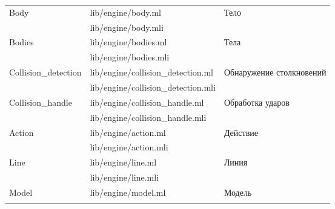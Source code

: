 \begin{centering}
\begin{longtable}{|l|l|l|}
        \multirow{2}{*}{Body}                                 & lib/engine/body.ml                  & \multirow{2}{*}{Тело}                       \\\nopagebreak \cline{2-2}
                                                              & lib/engine/body.mli                 &                                             \\ \hline
        \multirow{2}{*}{Bodies}                               & lib/engine/bodies.ml                & \multirow{2}{*}{Тела}                       \\\nopagebreak \cline{2-2}
                                                              & lib/engine/bodies.mli               &                                             \\ \hline
        \multirow{2}{*}{Collision\_detection}                 & lib/engine/collision\_detection.ml  & \multirow{2}{2cm}{Обнаружение столкновений} \\\nopagebreak \cline{2-2}
                                                              & lib/engine/collision\_detection.mli &                                             \\ \hline
        \multirow{2}{*}{Collision\_handle}                    & lib/engine/collision\_handle.ml     & \multirow{2}{*}{Обработка ударов}           \\\nopagebreak \cline{2-2}
                                                              & lib/engine/collision\_handle.mli    &                                             \\ \hline
        \multirow{2}{*}{Action}                               & lib/engine/action.ml                & \multirow{2}{*}{Действие}                   \\\nopagebreak \cline{2-2}
                                                              & lib/engine/action.mli               &                                             \\ \hline
        \multirow{2}{*}{Line}                                 & lib/engine/line.ml                  & \multirow{2}{*}{Линия}                      \\\nopagebreak \cline{2-2}
                                                              & lib/engine/line.mli                 &                                             \\ \hline
        \multirow{2}{*}{Model}                                & lib/engine/model.ml                 & \multirow{2}{*}{Модель}                     \\\nopagebreak \cline{2-2}

\end{longtable}
\end{centering}
